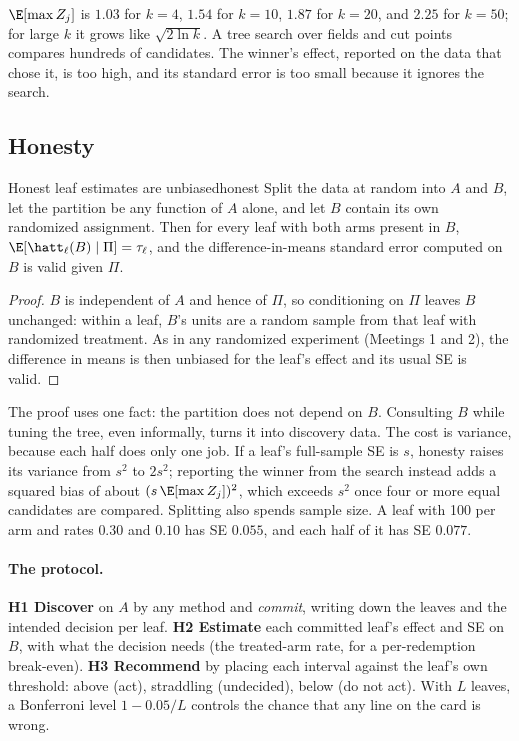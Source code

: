\documentclass[11pt]{article}
\begin{document}
$\E[\max Z_j]$ is $1.03$ for $k = 4$, $1.54$ for $k = 10$, $1.87$ for $k = 20$, and $2.25$ for $k = 50$; for large
$k$ it grows like $\sqrt{2\ln k}$. A tree search over fields and cut points compares hundreds of candidates. The winner's
effect, reported on the data that chose it, is too high, and its standard error is too small because it ignores
the search.

\subsection{Honesty}

\begin{prop}{Honest leaf estimates are unbiased}{honest}
Split the data at random into $A$ and $B$, let the partition be any function of $A$ alone, and let $B$ contain its
own randomized assignment. Then for every leaf with both arms present in $B$,
$\E[\hatt_\ell(B) \mid \Pi] = \tau_\ell$, and the difference-in-means standard error computed on $B$ is valid given
$\Pi$.
\end{prop}
\begin{proof}
$B$ is independent of $A$ and hence of $\Pi$, so conditioning on $\Pi$ leaves $B$ unchanged: within a leaf, $B$'s
units are a random sample from that leaf with randomized treatment. As in any randomized experiment
(Meetings 1 and 2), the difference in means is then unbiased for the leaf's effect and its usual SE is valid.
\end{proof}

The proof uses one fact: the partition does not depend on $B$. Consulting $B$ while tuning the tree, even
informally, turns it into discovery data. The cost is variance, because each half does only one job. If a leaf's full-sample
SE is $s$, honesty raises its variance from $s^2$ to $2s^2$; reporting the winner from the search instead adds a
squared bias of about $(s\,\E[\max Z_j])^2$, which exceeds $s^2$ once four or more equal candidates are compared.
Splitting also spends sample size. A leaf with 100 per arm and rates $0.30$ and $0.10$ has SE $0.055$, and each half
of it has SE $0.077$.

\paragraph{The protocol.} \textbf{H1 Discover} on $A$ by any method and \emph{commit}, writing down the leaves and
the intended decision per leaf. \textbf{H2 Estimate} each committed leaf's effect and SE on $B$, with what the
decision needs (the treated-arm rate, for a per-redemption break-even). \textbf{H3 Recommend} by placing each
interval against the leaf's own threshold: above (act), straddling (undecided), below (do not act). With $L$
leaves, a Bonferroni level $1 - 0.05/L$ controls the chance that any line on the card is wrong.
\end{document}

